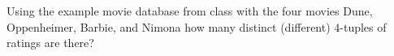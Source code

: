 
Using the example movie database from class with the four movies Dune, Oppenheimer, Barbie, and Nimona how many distinct (different) $4$-tuples of ratings are there? 
